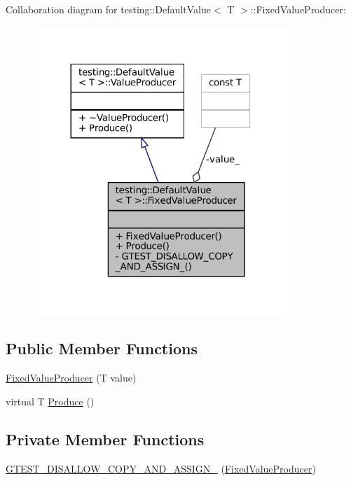 Collaboration diagram for testing\+:\+:Default\+Value$<$ T $>$\+:\+:Fixed\+Value\+Producer\+:
\nopagebreak
\begin{figure}[H]
\begin{center}
\leavevmode
\includegraphics[width=272pt]{classtesting_1_1DefaultValue_1_1FixedValueProducer__coll__graph}
\end{center}
\end{figure}
\subsection*{Public Member Functions}
\begin{DoxyCompactItemize}
\item 
\hyperlink{classtesting_1_1DefaultValue_1_1FixedValueProducer_a694f403694251385d385587b61a4ac95}{Fixed\+Value\+Producer} (T value)
\item 
virtual T \hyperlink{classtesting_1_1DefaultValue_1_1FixedValueProducer_ad7f695192e9dbc5f54cdb405655e7125}{Produce} ()
\end{DoxyCompactItemize}
\subsection*{Private Member Functions}
\begin{DoxyCompactItemize}
\item 
\hyperlink{classtesting_1_1DefaultValue_1_1FixedValueProducer_aeadb3fbaf90b8a20612b124a39809e30}{G\+T\+E\+S\+T\+\_\+\+D\+I\+S\+A\+L\+L\+O\+W\+\_\+\+C\+O\+P\+Y\+\_\+\+A\+N\+D\+\_\+\+A\+S\+S\+I\+G\+N\+\_\+} (\hyperlink{classtesting_1_1DefaultValue_1_1FixedValueProducer}{Fixed\+Value\+Producer})
\end{DoxyCompactItemize}
